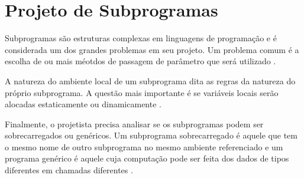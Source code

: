 \section{Projeto de Subprogramas} 
\label{sec:projeto_de_subprogramas}
Subprogramas são estruturas complexas em linguagens de programação 
e é considerada um dos grandes problemas em seu projeto.
Um problema comum é a escolha de ou mais méotdos de
passagem de parâmetro que será utilizado \cite{sebesta}. 

A natureza do ambiente local de um subprograma dita as regras da natureza do 
próprio subprograma. A questão mais importante é se variáveis locais serão alocadas 
estaticamente ou dinamicamente \cite{sebesta}.

Finalmente, o projetista precisa analisar se os
subprogramas podem ser sobrecarregados ou genéricos.
Um subprograma sobrecarregado é aquele que tem o mesmo nome de outro 
subprograma no mesmo ambiente referenciado e um programa genérico
é aquele cuja computação pode ser feita dos dados de tipos 
diferentes em chamadas diferentes \cite{sebesta}.
